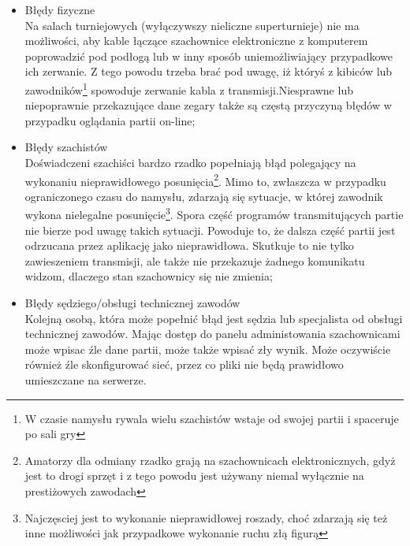 \documentclass[12pt,leqno]{article}
\begin{document}
\begin{itemize}

\item Błędy fizyczne \\
Na salach turniejowych (wyłączywszy nieliczne superturnieje) nie ma możliwości, aby kable łączące szachownice elektroniczne z komputerem poprowadzić pod podłogą lub w inny sposób uniemożliwiający przypadkowe ich zerwanie. Z tego powodu trzeba brać pod uwagę, iż któryś z kibiców lub zawodników\footnote{W czasie namysłu rywala wielu szachistów wstaje od swojej partii i spaceruje po sali gry} spowoduje zerwanie kabla z transmisji.Niesprawne lub niepoprawnie przekazujące dane zegary także są częstą przyczyną błędów w przypadku oglądania partii on-line;

\item Błędy szachistów\\ 
Doświadczeni szachiści bardzo rzadko popełniają błąd polegający na wykonaniu nieprawidłowego posunięcia\footnote{Amatorzy dla odmiany rzadko grają na szachownicach elektronicznych, gdyż jest to drogi sprzęt i z tego powodu jest używany niemal wyłącznie na prestiżowych zawodach}. Mimo to, zwłaszcza w przypadku ograniczonego czasu do namysłu, zdarzają się sytuacje, w której zawodnik wykona nielegalne posunięcie\footnote{Najczęsciej jest to wykonanie nieprawidłowej roszady, choć zdarzają się też inne możliwości jak przypadkowe wykonanie ruchu złą figurą}. Spora część programów transmitujących partie nie bierze pod uwagę takich sytuacji. Powoduje to, że dalsza część partii jest odrzucana przez aplikację jako nieprawidłowa. Skutkuje to nie tylko zawieszeniem transmisji, ale także nie przekazuje żadnego komunikatu widzom, dlaczego stan szachownicy się nie zmienia;

\item Błędy sędziego/obsługi technicznej zawodów\\
Kolejną osobą, która może popełnić błąd jest sędzia lub specjalista od obsługi technicznej zawodów. Mając dostęp do panelu administowania szachownicami może wpisac źle dane partii, może także wpisać zły wynik. Może oczywiście również źle skonfigurować sieć, przez co pliki nie będą prawidłowo umieszczane na serwerze. 


\end{itemize}
\end{document}
